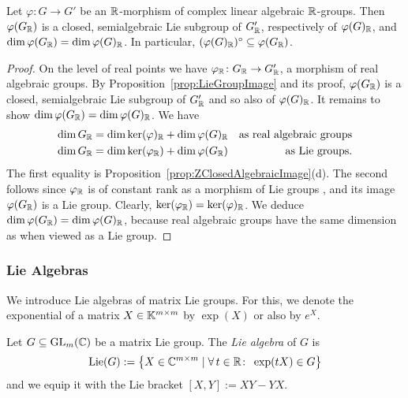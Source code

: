 \begin{cor}\label{cor:ImageRealPoints}
	Let $\varphi \colon G \to G'$ be an $\mathbb R$-morphism of complex linear algebraic $\mathbb R$-groups. Then $\varphi(G_{\mathbb R})$ is a closed, semialgebraic Lie subgroup of $G'_{\mathbb R}$, respectively of $\varphi(G)_{\mathbb R}$, and $\dim \varphi(G_\mathbb R) = \dim \varphi(G)_{\mathbb R}$. In particular, $(\varphi(G)_{\mathbb R})^\circ \subseteq \varphi(G_{\mathbb R})$.
\end{cor}

\begin{proof}
	On the level of real points we have $\varphi_\mathbb R \colon G_{\mathbb R} \to G'_\mathbb R$, a morphism of real algebraic groups. By Proposition~\ref{prop:LieGroupImage} and its proof, $\varphi(G_\mathbb R)$ is a closed, semialgebraic Lie subgroup of $G'_\mathbb R$ and so also of $\varphi(G)_\mathbb R$. It remains to show $\dim \varphi(G_\mathbb R) = \dim \varphi(G)_{\mathbb R}$. We have
		\begin{align*}
			\dim G_\mathbb R &= \dim \ker (\varphi)_\mathbb R + \dim \varphi(G)_\mathbb R &\text{as real algebraic groups} \\
			\dim G_\mathbb R &= \dim \ker(\varphi_\mathbb R) + \dim \varphi(G_\mathbb R) &\text{as Lie groups}.
		\end{align*}
	The first equality is Proposition~\ref{prop:ZClosedAlgebraicImage}(d). The second follows since $\varphi_\mathbb R$ is of constant rank as a morphism of Lie groups \cite[Theorem~2 in §1.1.6]{OnishchikVinbergBook}, and its image $\varphi(G_\mathbb R)$ is a Lie group.
	Clearly, $\ker(\varphi_\mathbb R) = \ker(\varphi)_\mathbb R$. We deduce $\dim \varphi(G_\mathbb R) = \dim \varphi(G)_{\mathbb R}$, because real algebraic groups have the same dimension as when viewed as a Lie group.
\end{proof}



\subsubsection{Lie Algebras}

We introduce Lie algebras of matrix Lie groups. For this, we denote the exponential of a matrix $X \in \mathbb K^{m \times m}$ by $\exp(X)$ or also by $e^X$.

\begin{defn} \label{defn:LieAlgebra}
	Let $G \subseteq \operatorname{GL}_m(\mathbb C)$ be a matrix Lie group. The \emph{Lie algebra} of $G$ is
		\[ \operatorname{Lie} (G) := \big\{ X \in \mathbb C^{m \times m} \mid \forall \,  t \in \mathbb R \colon \; \exp(tX) \in G \big\} \]
	and we equip it with the Lie bracket $[X,Y] := XY - YX$.
	\hfill{}
\end{defn}

